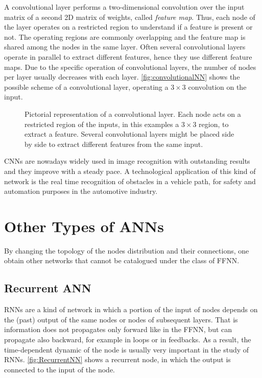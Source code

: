 A convolutional layer performs a two-dimensional convolution over the input matrix of a second 2D matrix of weights, called \textit{feature map}.
Thus, each node of the layer operates on a restricted region to understand if a feature is present or not.
The operating regions are commonly overlapping and the feature map is shared among the nodes in the same layer.
Often several convolutional layers operate in parallel to extract different features, hence they use different feature maps.
Due to the specific operation of convolutional layers, the number of nodes per layer usually decreases with each layer.
\autoref{fig:convolutionalNN} shows the possible scheme of a convolutional layer, operating a $3\times 3$ convolution on the input.

\begin{figure}[ht]
	\centering
	
	\caption{%
		Pictorial representation of a convolutional layer.
		Each node acts on a restricted region of the inputs, in this examples a $3\times 3$ region, to extract a feature.
		Several convolutional layers might be placed side by side to extract different features from the same input.
		}
	\label{fig:convolutionalNN}
\end{figure}

\acsp{CNN} are nowadays widely used in image recognition with outstanding results and they improve with a steady pace.
A technological application of this kind of network is the real time recognition of obstacles in a vehicle path, for safety and automation purposes in the automotive industry.

\section{Other Types of \acsp{ANN}}
\label{sec:Other_Types_of_NNs}
By changing the topology of the nodes distribution and their connections, one obtain other networks that cannot be catalogued under the class of \acs{FFNN}.

\subsection{Recurrent ANN}
\label{ssec:Recurrent_ANN}
\acp{RNN} are a kind of network in which a portion of the input of nodes depends on the (past) output of the same nodes or nodes of subsequent layers.
That is information does not propagates only forward like in the \acs{FFNN}, but can propagate also backward, for example in loops or in feedbacks.
As a result, the time-dependent dynamic of the node is usually very important in the study of \acsp{RNN}.
\autoref{fig:RecurrentNN} shows a recurrent node, in which the output is connected to the input of the node.


